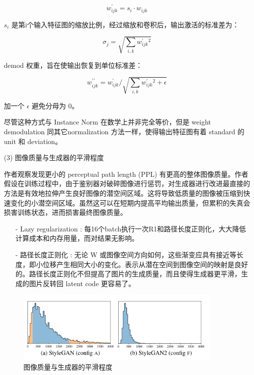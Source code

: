 \begin{equation}
w_{i j k}^{\prime}=s_{i} \cdot w_{i j k}
\end{equation}

$s_{i}$ 是第i个输入特征图的缩放比例，经过缩放和卷积后，输出激活的标准差为：

\begin{equation}
\sigma_{j}=\sqrt{\sum_{i, k} w_{i j k}^{\prime}{ }^{2}}
\end{equation}

demod 权重，旨在使输出恢复到单位标准差：

\begin{equation}
w_{i j k}^{\prime \prime}=w_{i j k}^{\prime} / \sqrt{\sum_{i, k} w_{i j k}^{\prime}{ }^{2}+\epsilon}
\end{equation}

加一个 $\epsilon$ 避免分母为 0。

尽管这种方式与 Instance Norm 在数学上并非完全等价，但是 weight demodulation 同其它normalization 方法一样，使得输出特征图有着 standard 的 unit 和 deviation。

(3) 图像质量与生成器的平滑程度

作者观察发现更小的 perceptual path length (PPL) 有更高的整体图像质量。作者假设在训练过程中，由于鉴别器对破碎图像进行惩罚，对生成器进行改进最直接的方法是有效地拉伸产生良好图像的潜空间区域。这将导致低质量的图像被压缩到快速变化的小潜空间区域。虽然这可以在短期内提高平均输出质量，但累积的失真会损害训练状态，进而损害最终图像质量。

\begin{enumerate}
 \item [-] Lazy regularization : 每16个batch执行一次R1和路径长度正则化，大大降低计算成本和内存用量，而对结果无影响。
 \item [-] 路径长度正则化 : 无论 W 或图像空间方向如何，这些渐变应具有接近等长度，即小位移产生相同大小的变化。表示从潜在空间到图像空间的映射是良好的。路径长度正则化不但提高了图片的生成质量，而且使得生成器更平滑，生成的图片反转回 latent code 更容易了。
\end{enumerate}

\begin{figure}[htb]
\centering 
\includegraphics[width=0.9\textwidth]{img/m2t14.png} 
\caption{图像质量与生成器的平滑程度}
\label{Test}
\end{figure}

